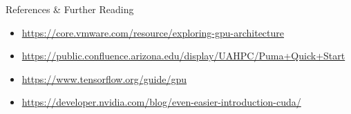 \documentclass[dvipsnames,pdf,9pt]{beamer}
\newcommand{\<}{\langle}
\renewcommand{\>}{\rangle}
\begin{document}
\begin{frame}{References \& Further Reading}
  \begin{itemize}
  \item \href{https://core.vmware.com/resource/exploring-gpu-architecture}{https://core.vmware.com/resource/exploring-gpu-architecture}
  \item \href{https://public.confluence.arizona.edu/display/UAHPC/Puma+Quick+Start}{https://public.confluence.arizona.edu/display/UAHPC/Puma+Quick+Start}
  \item \href{https://www.tensorflow.org/guide/gpu}{https://www.tensorflow.org/guide/gpu}
  \item \href{https://developer.nvidia.com/blog/even-easier-introduction-cuda/}{https://developer.nvidia.com/blog/even-easier-introduction-cuda/}
    
  \end{itemize}
\end{frame}
\end{document}
